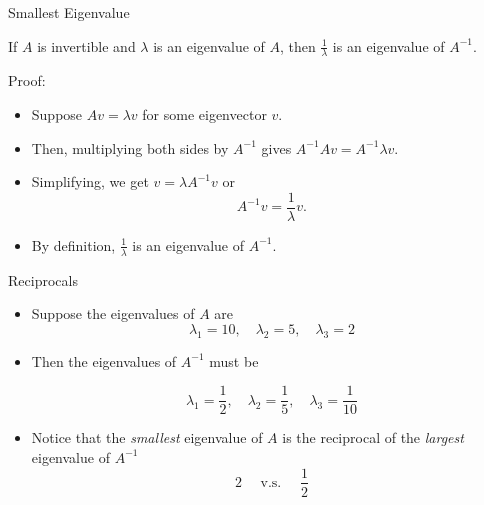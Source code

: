 \documentclass[10pt]{beamer}
\begin{document}
\begin{frame}{Smallest Eigenvalue}

{
}
    \begin{theorem}
        If $A$ is invertible and $\lambda$ is an eigenvalue of $A$, then $\frac{1}{\lambda}$ is an eigenvalue of $A^{-1}$. 
    \end{theorem}
    Proof: 
    \begin{itemize}
        \item Suppose \( A v = \lambda v \) for some eigenvector \( v \).
        \item Then, multiplying both sides by \( A^{-1} \) gives \( A^{-1} A v = A^{-1} \lambda v \).
        \item Simplifying, we get \( v = \lambda A^{-1} v \) or 
            $$ A^{-1} v = \frac{1}{\lambda} v. $$
        \item By definition, \( \frac{1}{\lambda} \) is an eigenvalue of \( A^{-1} \).
    \end{itemize}
\end{frame}


\begin{frame}{Reciprocals}

\begin{itemize}
    \item Suppose the eigenvalues of $A$ are
    $$
    \lambda_1 = 10,\quad  \lambda_2 = 5,\quad  \lambda_3 = 2
    $$
    
    \item Then the eigenvalues of $A^{-1}$ must be 

    $$
    \lambda_1 = \frac{1}{2},\quad  \lambda_2 = \frac{1}{5},\quad  \lambda_3 = \frac{1}{10}
    $$
    
    \item<2> Notice that the \textit{smallest} eigenvalue of $A$ is the reciprocal of the \textit{largest} eigenvalue of $A^{-1}$
    $$
    2 \quad \text{ v.s. } \quad \frac{1}{2}
    $$
\end{itemize}

\end{frame}
\end{document}
